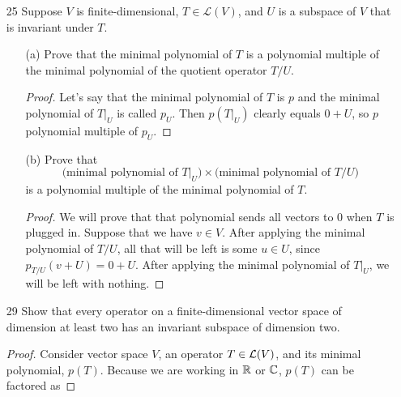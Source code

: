 \begin{enumerate}
\begin{proof}
        $$a_{\dim V}T^{\dim V} + \dots + a_1T - I = 0$$

        Thus this polynomial is a polynomial multiple of the minimal polynomial. Because the constant term is non-zero, the constant term of the minimal polynomial must not be zero as well (because otherwise we would have 0 as a factor of the above polynomial).
    \end{proof}

    
    \item[25] Suppose $V$ is finite-dimensional, $T \in \mathcal L(V)$, and $U$ is a subspace of $V$ that is invariant under $T$.

    \begin{enumerate}
        \item[(a)] Prove that the minimal polynomial of $T$ is a polynomial multiple of the minimal polynomial of the quotient operator $T/U$.

        \begin{proof}
            Let's say that the minimal polynomial of $T$ is $p$ and the minimal polynomial of $T|_U$ is called $p_U$. Then $p(T|_U)$ clearly equals $0 + U$, so $p$ polynomial multiple of $p_U$. 
        \end{proof}
        \item[(b)] Prove that
        \[
            \text{(minimal polynomial of } T|_U\text{)} \times \text{(minimal polynomial of } T/U\text{)}
        \]
        is a polynomial multiple of the minimal polynomial of $T$.

        \begin{proof}
            We will prove that that polynomial sends all vectors to 0 when $T$ is plugged in. Suppose that we have $v \in V$. After applying the minimal polynomial of $T/U$, all that will be left is some $u \in U$, since $p_{T/U}(v + U) = 0 + U$. After applying the minimal polynomial of $T|_U$, we will be left with nothing. 
        \end{proof}
    \end{enumerate}

    \item[29] Show that every operator on a finite-dimensional vector space of dimension at least two has an invariant subspace of dimension two.
    
    \begin{proof}
        Consider vector space $V$, an operator $T \in \mathcal L(V)$, and its minimal polynomial, $p(T)$. Because we are working in $\mathbb{R}$ or $\mathbb{C}$, $p(T)$ can be factored as 


\end{proof}
\end{enumerate}

